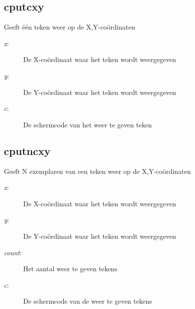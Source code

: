 \subsection{cputcxy}
\begin{description}[leftmargin=2.4cm,style=nextline]
\item [Beschrijving:] {Geeft één teken weer op de X,Y-coördinaten}\item [Syntaxis:] \item [Parameters:]
\begin{description}
\item [{\em x}:] {De X-coördinaat waar het teken wordt   weergegeven}\item [{\em y}:] {De Y-coördinaat waar het teken wordt   weergegeven}\item [{\em c}:] {De schermcode van het weer te geven teken}
\end{description}
\end{description}

\subsection{cputncxy}
\begin{description}[leftmargin=2.4cm,style=nextline]
\item [Beschrijving:] {Geeft N exemplaren van een teken weer op de X,Y-coördinaten}\item [Syntaxis:] \item [Parameters:]
\begin{description}
\item [{\em x}:] {De X-coördinaat waar het teken wordt weergegeven}\item [{\em y}:] {De Y-coördinaat waar het teken wordt weergegeven}\item [{\em count}:] {Het   aantal weer te geven tekens}\item [{\em c}:] {De schermcode van de   weer te geven tekens}
\end{description}
\end{description}

